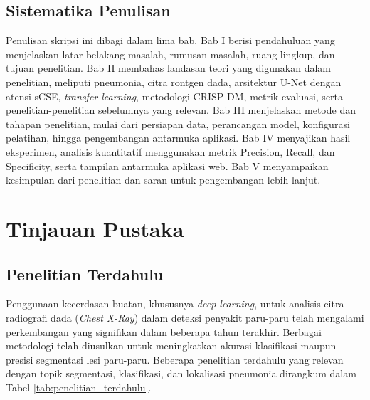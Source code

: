 \documentclass[12pt,a4paper,oneside]{book}
\begin{document}
\section{Sistematika Penulisan}

Penulisan skripsi ini dibagi dalam lima bab. Bab I berisi pendahuluan yang menjelaskan latar belakang masalah, rumusan masalah, ruang lingkup, dan tujuan penelitian. Bab II membahas landasan teori yang digunakan dalam penelitian, meliputi pneumonia, citra rontgen dada, arsitektur U-Net dengan atensi sCSE, \textit{transfer learning}, metodologi CRISP-DM, metrik evaluasi, serta penelitian-penelitian sebelumnya yang relevan. Bab III menjelaskan metode dan tahapan penelitian, mulai dari persiapan data, perancangan model, konfigurasi pelatihan, hingga pengembangan antarmuka aplikasi. Bab IV menyajikan hasil eksperimen, analisis kuantitatif menggunakan metrik Precision, Recall, dan Specificity, serta tampilan antarmuka aplikasi web. Bab V menyampaikan kesimpulan dari penelitian dan saran untuk pengembangan lebih lanjut.

\chapter[TINJAUAN PUSTAKA]{Tinjauan Pustaka}

\section{Penelitian Terdahulu}

Penggunaan kecerdasan buatan, khususnya \textit{deep learning}, untuk analisis citra radiografi dada (\textit{Chest X-Ray}) dalam deteksi penyakit paru-paru telah mengalami perkembangan yang signifikan dalam beberapa tahun terakhir. Berbagai metodologi telah diusulkan untuk meningkatkan akurasi klasifikasi maupun presisi segmentasi lesi paru-paru. Beberapa penelitian terdahulu yang relevan dengan topik segmentasi, klasifikasi, dan lokalisasi pneumonia dirangkum dalam Tabel \ref{tab:penelitian_terdahulu}.
\end{document}
